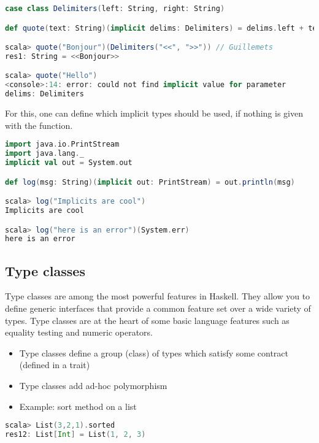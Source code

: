 \begin{lstlisting}[language=scala,mathescape=false]
case class Delimiters(left: String, right: String)

def quote(text: String)(implicit delims: Delimiters) = delims.left + text + delims.right

scala> quote("Bonjour")(Delimiters("<<", ">>")) // Guillemets
res1: String = <<Bonjour>>

scala> quote("Hello")
<console>:14: error: could not find implicit value for parameter
delims: Delimiters
\end{lstlisting}

For this, one can define which implicit types should be used, if nothing
is given with the function.

\begin{lstlisting}[language=scala,mathescape=false]
import java.io.PrintStream
import java.lang._
implicit val out = System.out

def log(msg: String)(implicit out: PrintStream) = out.println(msg)

scala> log("Implicits are cool")
Implicits are cool

scala> log("here is an error")(System.err)
here is an error
\end{lstlisting}

\hypertarget{type-classes}{%
\subsection{Type classes}\label{type-classes}}

Type classes are among the most powerful features in Haskell. They allow
you to define generic interfaces that provide a common feature set over
a wide variety of types. Type classes are at the heart of some basic
language features such as equality testing and numeric operators.

\begin{itemize}
\tightlist
\item
  Type classes define a group (class) of types which satisfy some
  contract (defined in a trait)
\item
  Type classes add ad-hoc polymorphism
\item
  Example: sort method on a list
\end{itemize}

\begin{lstlisting}[language=scala,mathescape=false]
scala> List(3,2,1).sorted
res12: List[Int] = List(1, 2, 3)
\end{lstlisting}

